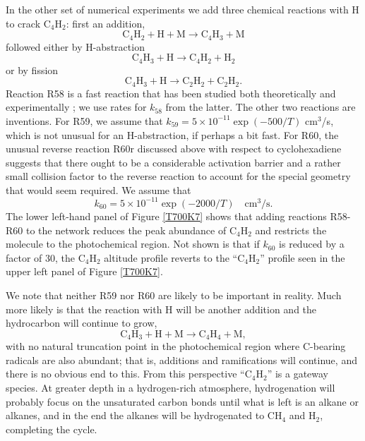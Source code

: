 \documentclass[preprint]{aastex6}
\newcounter{reaction}
\begin{document}
In the other set of numerical experiments we add three chemical reactions with H to crack C$_4$H$_2$:
first an addition,
\begin{equation}\tag{R58}
  \mathrm{C}_4\mathrm{H}_2 + \mathrm{H} + \mathrm{M} \rightarrow \mathrm{C}_4\mathrm{H}_3  + \mathrm{M}
\end{equation} 
followed either by H-abstraction 
\begin{equation}\tag{R59}
  \mathrm{C}_4\mathrm{H}_3 + \mathrm{H}  \rightarrow \mathrm{C}_4\mathrm{H}_2  + \mathrm{H}_2
\end{equation} 
or by fission
\begin{equation}\tag{R60}
  \mathrm{C}_4\mathrm{H}_3 + \mathrm{H}  \rightarrow \mathrm{C}_2\mathrm{H}_2  + \mathrm{C}_2\mathrm{H}_2.
\end{equation} 
Reaction R58 is a fast reaction that has been studied both theoretically
and experimentally \citep{Eiteneer2003,Klippenstein2005}; we use rates for $k_{58}$ from the latter.
The other two reactions are inventions.
For R59, we assume that $k_{59}=5\times 10^{-11} \exp{\left(-500/T\right)}$ cm$^3$/s, which is not unusual for an H-abstraction,
if perhaps a bit fast.
For R60, the unusual reverse reaction R60r discussed above with respect to cyclohexadiene suggests that there ought to be a considerable
activation barrier and a rather small collision factor to the reverse reaction
to account for the special geometry that would seem required.
We assume that 
\begin{equation}\label{k60}
k_{60}=5\times 10^{-11} \exp{\left(-2000/T\right)} \quad \mathrm{cm}^3/\mathrm{s}.
\end{equation}
 The lower left-hand panel of Figure \ref{T700K7} shows that adding reactions R58-R60 to the network reduces
 the peak abundance of C$_4$H$_2$ and restricts the molecule to the photochemical region.
 Not shown is that if $k_{60}$ is reduced by a factor of 30, the 
 C$_4$H$_2$ altitude profile reverts to the ``C$_4$H$_2$'' profile seen in the upper left panel of Figure \ref{T700K7}.
 
We note that neither R59 nor R60 are likely to be important in reality.   
Much more likely is that the reaction with H will be another addition \citep{Harding2007} and the hydrocarbon will continue to grow,
\begin{equation}\tag{R61}
  \mathrm{C}_4\mathrm{H}_3 + \mathrm{H} + \mathrm{M}  \rightarrow \mathrm{C}_4\mathrm{H}_4  + \mathrm{M}, 
\end{equation}
with no natural truncation point in the photochemical region where C-bearing radicals are also abundant;
that is, additions and ramifications will continue, and there is no obvious end to this.
From this perspective ``C$_4$H$_2$'' is a gateway species. 
At greater depth in a hydrogen-rich atmosphere, hydrogenation will probably focus on the unsaturated carbon
bonds until what is left is an alkane or alkanes, and in the end the alkanes will be hydrogenated to CH$_4$ and H$_2$,
completing the cycle.
 
\end{document}
